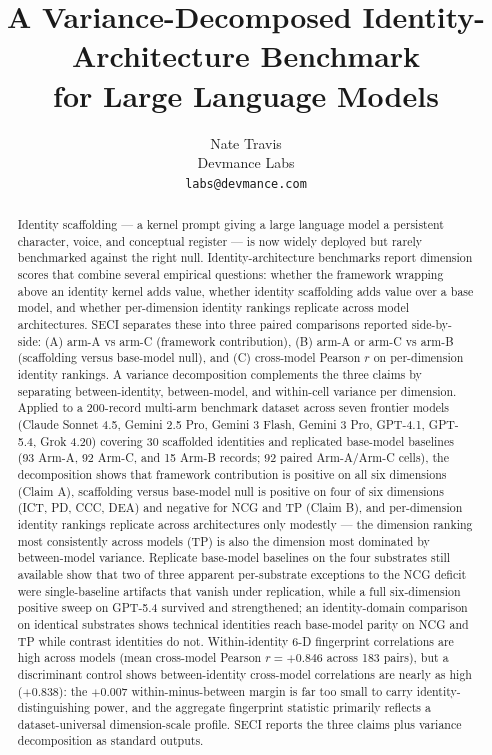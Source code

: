 \documentclass[11pt]{article}
\title{\textbf{A Variance-Decomposed Identity-Architecture Benchmark\\
for Large Language Models}}
\author{Nate Travis\\
Devmance Labs\\
\texttt{labs@devmance.com}}
\date{}
\begin{document}
\maketitle

\begin{abstract}
\noindent
Identity scaffolding --- a kernel prompt giving a large language model a persistent character, voice, and conceptual register --- is now widely deployed but rarely benchmarked against the right null. Identity-architecture benchmarks report dimension scores that combine several empirical questions: whether the framework wrapping above an identity kernel adds value, whether identity scaffolding adds value over a base model, and whether per-dimension identity rankings replicate across model architectures. SECI separates these into three paired comparisons reported side-by-side: (A) arm-A vs arm-C (framework contribution), (B) arm-A or arm-C vs arm-B (scaffolding versus base-model null), and (C) cross-model Pearson $r$ on per-dimension identity rankings. A variance decomposition complements the three claims by separating between-identity, between-model, and within-cell variance per dimension. Applied to a 200-record multi-arm benchmark dataset across seven frontier models (Claude Sonnet 4.5, Gemini 2.5 Pro, Gemini 3 Flash, Gemini 3 Pro, GPT-4.1, GPT-5.4, Grok 4.20) covering 30 scaffolded identities and replicated base-model baselines (93 Arm-A, 92 Arm-C, and 15 Arm-B records; 92 paired Arm-A/Arm-C cells), the decomposition shows that framework contribution is positive on all six dimensions (Claim A), scaffolding versus base-model null is positive on four of six dimensions (ICT, PD, CCC, DEA) and negative for NCG and TP (Claim B), and per-dimension identity rankings replicate across architectures only modestly --- the dimension ranking most consistently across models (TP) is also the dimension most dominated by between-model variance. Replicate base-model baselines on the four substrates still available show that two of three apparent per-substrate exceptions to the NCG deficit were single-baseline artifacts that vanish under replication, while a full six-dimension positive sweep on GPT-5.4 survived and strengthened; an identity-domain comparison on identical substrates shows technical identities reach base-model parity on NCG and TP while contrast identities do not. Within-identity 6-D fingerprint correlations are high across models (mean cross-model Pearson $r = +0.846$ across 183 pairs), but a discriminant control shows between-identity cross-model correlations are nearly as high ($+0.838$): the $+0.007$ within-minus-between margin is far too small to carry identity-distinguishing power, and the aggregate fingerprint statistic primarily reflects a dataset-universal dimension-scale profile. SECI reports the three claims plus variance decomposition as standard outputs.
\end{abstract}
\end{document}
